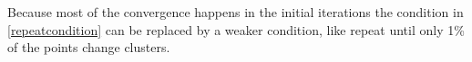 Because most of the convergence happens in the initial iterations the condition in \cref{repeatcondition} can be replaced by a weaker condition, like repeat until only 1\% of the points change clusters.

